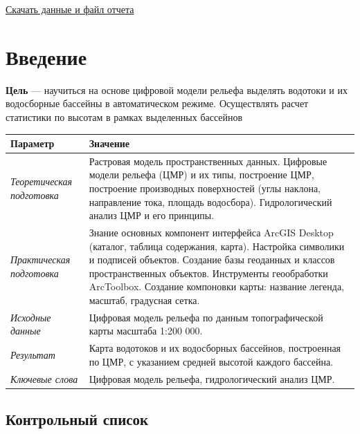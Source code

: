 \documentclass[12pt,]{book}
\begin{document}
\href{http://autolab.geogr.msu.ru/gis/data/Ex15.zip}{Скачать данные и файл отчета}

\hypertarget{dem-intro}{%
\section{Введение}\label{dem-intro}}

\textbf{Цель} --- научиться на основе цифровой модели рельефа выделять водотоки и их водосборные бассейны в автоматическом режиме. Осуществлять расчет статистики по высотам в рамках выделенных бассейнов

\begin{longtable}[]{@{}ll@{}}
\toprule
Параметр & Значение\tabularnewline
\midrule
\endhead
\emph{Теоретическая подготовка} & Растровая модель пространственных данных. Цифровые модели рельефа (ЦМР) и их типы, построение ЦМР, построение производных поверхностей (углы наклона, направление тока, площадь водосбора). Гидрологический анализ ЦМР и его принципы.\tabularnewline
\emph{Практическая подготовка} & Знание основных компонент интерфейса ArcGIS Desktop (каталог, таблица содержания, карта). Настройка символики и подписей объектов. Создание базы геоданных и классов пространственных объектов. Инструменты геообработки ArcToolbox. Создание компоновки карты: название легенда, масштаб, градусная сетка.\tabularnewline
\emph{Исходные данные} & Цифровая модель рельефа по данным топографической карты масштаба 1:200 000.\tabularnewline
\emph{Результат} & Карта водотоков и их водосборных бассейнов, построенная по ЦМР, с указанием средней высотой каждого бассейна.\tabularnewline
\emph{Ключевые слова} & Цифровая модель рельефа, гидрологический анализ ЦМР.\tabularnewline
\bottomrule
\end{longtable}

\hypertarget{dem-control}{%
\subsection{Контрольный список}\label{dem-control}}
\end{document}
